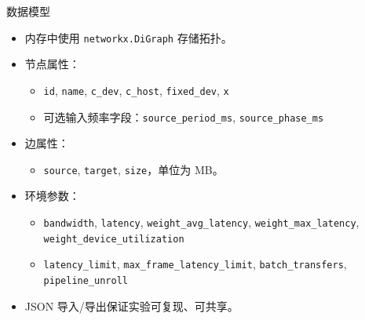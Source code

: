 \documentclass[aspectratio=169]{ctexbeamer}
\begin{document}
\begin{frame}{数据模型}
  \begin{itemize}
    \item 内存中使用 \texttt{networkx.DiGraph} 存储拓扑。
    \item 节点属性：
      \begin{itemize}
        \item \texttt{id}, \texttt{name}, \texttt{c\_dev}, \texttt{c\_host}, \texttt{fixed\_dev}, \texttt{x}
        \item 可选输入频率字段：\texttt{source\_period\_ms}, \texttt{source\_phase\_ms}
      \end{itemize}
    \item 边属性：
      \begin{itemize}
        \item \texttt{source}, \texttt{target}, \texttt{size}，单位为 MB。
      \end{itemize}
    \item 环境参数：
      \begin{itemize}
        \item \texttt{bandwidth}, \texttt{latency}, \texttt{weight\_avg\_latency}, \texttt{weight\_max\_latency}, \texttt{weight\_device\_utilization}
        \item \texttt{latency\_limit}, \texttt{max\_frame\_latency\_limit}, \texttt{batch\_transfers}, \texttt{pipeline\_unroll}
      \end{itemize}
    \item JSON 导入/导出保证实验可复现、可共享。
  \end{itemize}
\end{frame}
\end{document}
